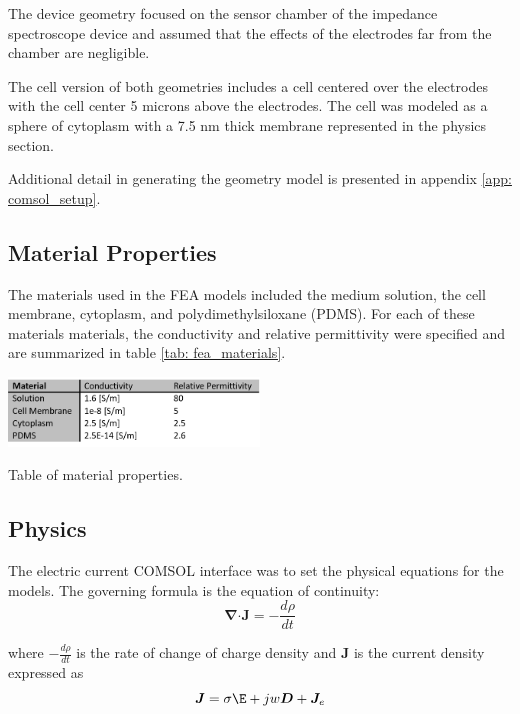\par The device geometry focused on the sensor chamber of the impedance spectroscope device and assumed that the effects of the electrodes far from the chamber are negligible. 


\par The cell version of both geometries includes a cell centered over the electrodes with the cell center 5 microns above the electrodes. The cell was modeled as a sphere of cytoplasm with a 7.5 nm thick membrane represented in the physics section. 

\par Additional detail in generating the geometry model is presented in appendix \ref{app: comsol_setup}.

\subsection*{Material Properties}
\par The materials used in the FEA models included the medium solution, the cell membrane, cytoplasm, and polydimethylsiloxane (PDMS). For each of these materials materials, the conductivity and relative permittivity were specified and are summarized in table \ref{tab: fea_materials}.

\begin{table}[]
    \centering
    \includegraphics[width=0.5\textwidth]{images/material properties table.png}
    \caption{Table of material properties.}
    \label{tab:fea_materials}
\end{table}

\subsection*{Physics}
\par The electric current COMSOL interface was to set the physical equations for the models. The governing formula is the equation of continuity:
\begin{equation}
    \boldsymbol\nabla \boldsymbol\cdot \boldsymbol J = -\frac{d\rho}{dt}
\end{equation}

where $-\frac{d\rho}{dt}$ is the rate of change of charge density and $\boldsymbol J$ is the current density expressed as
\begin{equation}
    \boldsymbol J = \sigma\boldsymbol\E + jw\boldsymbol D + \boldsymbol J_e
\end{equation}

